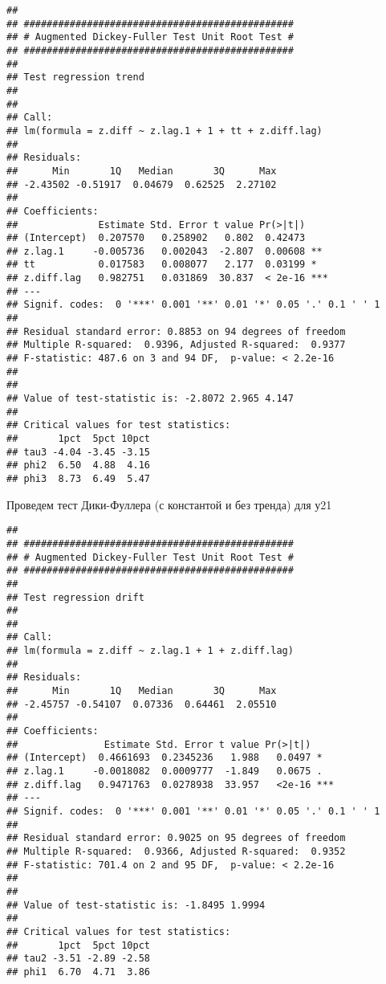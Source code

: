 \documentclass[
]{article}
\newenvironment{Shaded}{\begin{snugshade}}{\end{snugshade}}
\newcommand{\AttributeTok}[1]{\textcolor[rgb]{0.13,0.29,0.53}{#1}}
\newcommand{\FunctionTok}[1]{\textcolor[rgb]{0.13,0.29,0.53}{\textbf{#1}}}
\newcommand{\NormalTok}[1]{#1}
\newcommand{\SpecialCharTok}[1]{\textcolor[rgb]{0.81,0.36,0.00}{\textbf{#1}}}
\newcommand{\StringTok}[1]{\textcolor[rgb]{0.31,0.60,0.02}{#1}}
\begin{document}
\begin{verbatim}
## 
## ############################################### 
## # Augmented Dickey-Fuller Test Unit Root Test # 
## ############################################### 
## 
## Test regression trend 
## 
## 
## Call:
## lm(formula = z.diff ~ z.lag.1 + 1 + tt + z.diff.lag)
## 
## Residuals:
##      Min       1Q   Median       3Q      Max 
## -2.43502 -0.51917  0.04679  0.62525  2.27102 
## 
## Coefficients:
##              Estimate Std. Error t value Pr(>|t|)    
## (Intercept)  0.207570   0.258902   0.802  0.42473    
## z.lag.1     -0.005736   0.002043  -2.807  0.00608 ** 
## tt           0.017583   0.008077   2.177  0.03199 *  
## z.diff.lag   0.982751   0.031869  30.837  < 2e-16 ***
## ---
## Signif. codes:  0 '***' 0.001 '**' 0.01 '*' 0.05 '.' 0.1 ' ' 1
## 
## Residual standard error: 0.8853 on 94 degrees of freedom
## Multiple R-squared:  0.9396, Adjusted R-squared:  0.9377 
## F-statistic: 487.6 on 3 and 94 DF,  p-value: < 2.2e-16
## 
## 
## Value of test-statistic is: -2.8072 2.965 4.147 
## 
## Critical values for test statistics: 
##       1pct  5pct 10pct
## tau3 -4.04 -3.45 -3.15
## phi2  6.50  4.88  4.16
## phi3  8.73  6.49  5.47
\end{verbatim}

Проведем тест Дики-Фуллера (с константой и без тренда) для у21

\begin{Shaded}
\end{Shaded}

\begin{verbatim}
## 
## ############################################### 
## # Augmented Dickey-Fuller Test Unit Root Test # 
## ############################################### 
## 
## Test regression drift 
## 
## 
## Call:
## lm(formula = z.diff ~ z.lag.1 + 1 + z.diff.lag)
## 
## Residuals:
##      Min       1Q   Median       3Q      Max 
## -2.45757 -0.54107  0.07336  0.64461  2.05510 
## 
## Coefficients:
##               Estimate Std. Error t value Pr(>|t|)    
## (Intercept)  0.4661693  0.2345236   1.988   0.0497 *  
## z.lag.1     -0.0018082  0.0009777  -1.849   0.0675 .  
## z.diff.lag   0.9471763  0.0278938  33.957   <2e-16 ***
## ---
## Signif. codes:  0 '***' 0.001 '**' 0.01 '*' 0.05 '.' 0.1 ' ' 1
## 
## Residual standard error: 0.9025 on 95 degrees of freedom
## Multiple R-squared:  0.9366, Adjusted R-squared:  0.9352 
## F-statistic: 701.4 on 2 and 95 DF,  p-value: < 2.2e-16
## 
## 
## Value of test-statistic is: -1.8495 1.9994 
## 
## Critical values for test statistics: 
##       1pct  5pct 10pct
## tau2 -3.51 -2.89 -2.58
## phi1  6.70  4.71  3.86
\end{verbatim}
\end{document}
